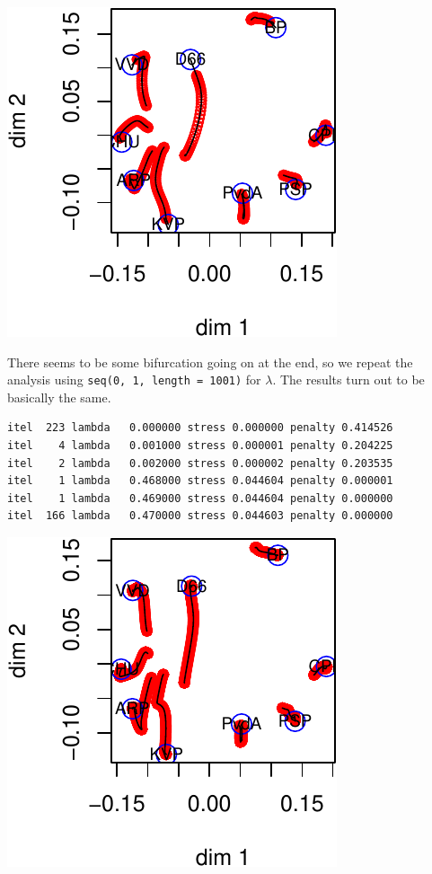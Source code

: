 \documentclass[
  12pt,
  letterpaper,
  DIV=11,
  numbers=noendperiod]{scrreprt}
\theoremstyle{remark}
\begin{document}
\begin{center}
\includegraphics{global_files/figure-pdf/poldist_run-1.pdf}
\end{center}

There seems to be some bifurcation going on at the end, so we repeat the
analysis using \texttt{seq(0,\ 1,\ length\ =\ 1001)} for \(\lambda\).
The results turn out to be basically the same.

\begin{verbatim}
itel  223 lambda   0.000000 stress 0.000000 penalty 0.414526 
itel    4 lambda   0.001000 stress 0.000001 penalty 0.204225 
itel    2 lambda   0.002000 stress 0.000002 penalty 0.203535 
itel    1 lambda   0.468000 stress 0.044604 penalty 0.000001 
itel    1 lambda   0.469000 stress 0.044604 penalty 0.000000 
itel  166 lambda   0.470000 stress 0.044603 penalty 0.000000 
\end{verbatim}

\begin{center}
\includegraphics{global_files/figure-pdf/poldist2-1.pdf}
\end{center}
\end{document}
